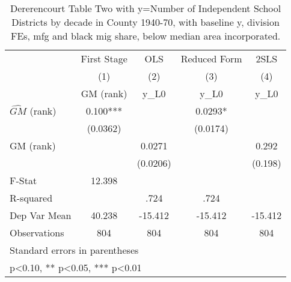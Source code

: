 \begin{table}[htbp]\centering
\def\sym#1{\ifmmode^{#1}\else\(^{#1}\)\fi}
\caption{Dererencourt Table Two with y=Number of Independent School Districts by decade in County 1940-70, with baseline y, division FEs, mfg and black mig share, below median area incorporated.}
\begin{tabular}{l*{4}{c}}
\toprule
                    & First Stage   &         OLS   &Reduced Form   &        2SLS   \\
                    &\multicolumn{1}{c}{(1)}&\multicolumn{1}{c}{(2)}&\multicolumn{1}{c}{(3)}&\multicolumn{1}{c}{(4)}\\
                    &\multicolumn{1}{c}{GM  (rank)}&\multicolumn{1}{c}{y\_L0}&\multicolumn{1}{c}{y\_L0}&\multicolumn{1}{c}{y\_L0}\\
\midrule
$\hat{GM}$ (rank)   &       0.100***&               &      0.0293*  &               \\
                    &    (0.0362)   &               &    (0.0174)   &               \\
\addlinespace
GM  (rank)          &               &      0.0271   &               &       0.292   \\
                    &               &    (0.0206)   &               &     (0.198)   \\
\midrule
F-Stat              &      12.398   &               &               &               \\
R-squared           &               &        .724   &        .724   &               \\
Dep Var Mean        &      40.238   &     -15.412   &     -15.412   &     -15.412   \\
Observations        &         804   &         804   &         804   &         804   \\
\bottomrule
\multicolumn{5}{l}{\footnotesize Standard errors in parentheses}\\
\multicolumn{5}{l}{\footnotesize * p<0.10, ** p<0.05, *** p<0.01}\\
\end{tabular}
\end{table}
